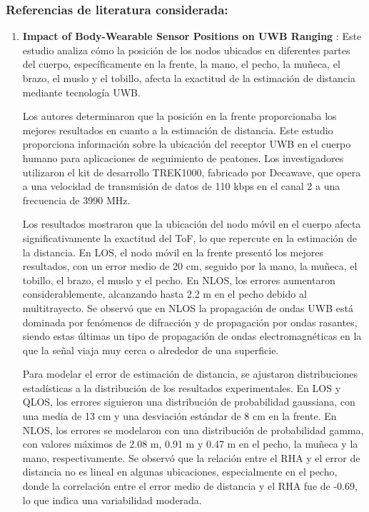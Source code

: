 \subsubsection{Referencias de literatura considerada:}

\begin{enumerate}
    \item \textbf{Impact of Body-Wearable Sensor Positions on UWB Ranging} \cite{ref14}: Este estudio analiza cómo la posición de los nodos ubicados en diferentes partes del cuerpo, específicamente en la frente, la mano, el pecho, la muñeca, el brazo, el muslo y el tobillo, afecta la exactitud de la estimación de distancia mediante tecnología UWB. 
    
    Los autores determinaron que la posición en la frente proporcionaba los mejores resultados en cuanto a la estimación de distancia. Este estudio proporciona información sobre la ubicación del receptor UWB en el cuerpo humano para aplicaciones de seguimiento de peatones. Los investigadores utilizaron el kit de desarrollo TREK1000, fabricado por Decawave, que opera a una velocidad de transmisión de datos de 110 kbps en el canal 2 a una frecuencia de 3990 MHz.

    Los resultados mostraron que la ubicación del nodo móvil en el cuerpo afecta significativamente la exactitud del ToF, lo que repercute en la estimación de la distancia. En LOS, el nodo móvil en la frente presentó los mejores resultados, con un error medio de 20 cm, seguido por la mano, la muñeca, el tobillo, el brazo, el muslo y el pecho. En NLOS, los errores aumentaron considerablemente, alcanzando hasta 2.2 m en el pecho debido al multitrayecto. Se observó que en NLOS la propagación de ondas UWB está dominada por fenómenos de difracción y de propagación por ondas rasantes, siendo estas últimas un tipo de propagación de ondas electromagnéticas en la que la señal viaja muy cerca o alrededor de una superficie.

    Para modelar el error de estimación de distancia, se ajustaron distribuciones estadísticas a la distribución de los resultados experimentales. En LOS y QLOS, los errores siguieron una distribución de probabilidad gaussiana, con una media de 13 cm y una desviación estándar de 8 cm en la frente. En NLOS, los errores se modelaron con una distribución de probabilidad gamma, con valores máximos de 2.08 m, 0.91 m y 0.47 m en el pecho, la muñeca y la mano, respectivamente. Se observó que la relación entre el RHA y el error de distancia no es lineal en algunas ubicaciones, especialmente en el pecho, donde la correlación entre el error medio de distancia y el RHA fue de -0.69, lo que indica una variabilidad moderada.


\end{enumerate}
